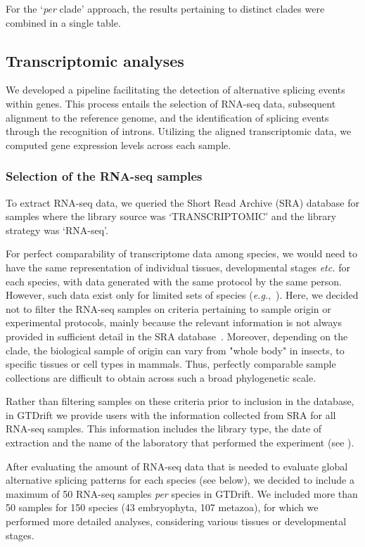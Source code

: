For the `\textit{per} clade' approach, the results pertaining to distinct clades were combined in a single table.

\subsection{Transcriptomic analyses}
\label{sec:transcriptomic_analyses}
We developed a pipeline facilitating the detection of alternative splicing events within genes. This process entails the selection of RNA-seq data, subsequent alignment to the reference genome, and the identification of splicing events through the recognition of introns. Utilizing the aligned transcriptomic data, we computed gene expression levels across each sample.

\subsubsection{Selection of the RNA-seq samples}
To extract RNA-seq data, we queried the Short Read Archive (SRA) database for samples where the library source was `TRANSCRIPTOMIC' and the library strategy was `RNA-seq'. 

For perfect comparability of transcriptome data among species, we would need to have the same representation of individual tissues, developmental stages \textit{etc.} for each species, with data generated with the same protocol by the same person. However, such data exist only for limited sets of species (\textit{e.g.},~\citet{cardoso-moreira_gene_2019}). 
Here, we decided not to filter the RNA-seq samples on criteria pertaining to sample origin or experimental protocols, mainly because the relevant information is not always provided in sufficient detail in the SRA database~\citep{leinonen_sequence_2011}. Moreover, depending on the clade, the biological sample of origin can vary from "whole body" in insects, to specific tissues or cell types in mammals. Thus, perfectly comparable sample collections are difficult to obtain across such a broad phylogenetic scale.


Rather than filtering samples on these criteria prior to inclusion in the database, in GTDrift we provide users with the information collected from SRA for all \acrshort{RNA}-seq samples. This information includes the library type, the date of extraction and the name of the laboratory that performed the experiment (see ).

After evaluating the amount of \acrshort{RNA}-seq data that is needed to evaluate global alternative splicing patterns for each species (see below), we decided to include a maximum of 50 \acrshort{RNA}-seq samples \textit{per} species in GTDrift. We included more than 50 samples for 150 species (43 embryophyta, 107 metazoa), for which we performed more detailed analyses, considering various tissues or developmental stages.

